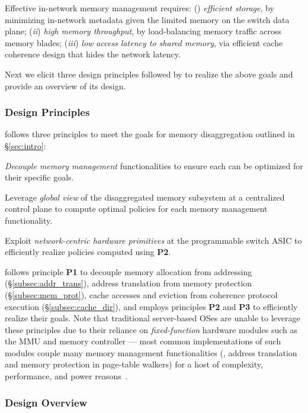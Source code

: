 Effective in-network memory management requires: () \emph{efficient storage}, by  minimizing in-network metadata given the limited memory on the switch data plane;  (\textit{ii}) \emph{high memory throughput}, by load-balancing memory traffic across memory blades; (\textit{iii}) \emph{low access latency to shared memory}, via efficient cache coherence design that hides the network latency.

Next we elicit  three design principles followed by \mind to realize the above goals and provide an overview of its design.

\subsubsection{Design Principles}
\label{sssec:principles}

\mind follows three principles to meet the goals for memory disaggregation outlined in \S\ref{sec:intro}:

 \textit{Decouple memory management} functionalities to ensure each can be optimized for their specific goals.

 Leverage \textit{global view} of the disaggregated memory subsystem at a centralized control plane to compute optimal policies for each memory management functionality.

 Exploit \textit{network-centric hardware primitives} at the programmable switch ASIC to efficiently realize policies computed using \textbf{P2}.

\vspace{0.075in}\noindent

\mind follows principle \textbf{P1} to decouple memory allocation from addressing (\S\ref{subsec:addr_trans}), address translation from memory protection (\S\ref{subsec:mem_prot}),  cache accesses and eviction from coherence protocol execution (\S\ref{subsec:cache_dir}),  and employs principles \textbf{P2} and \textbf{P3} to efficiently realize their goals. Note that traditional server-based OSes are unable to leverage these principles due to  their reliance on \textit{fixed-function} hardware modules such as the MMU and memory controller --- most common implementations of such modules couple many memory management functionalities (\eg, address translation and memory protection in page-table walkers) for a host of complexity, performance, and power reasons~\cite{vmbook, seesaw, rmmlite}.

\subsubsection{Design Overview}
\label{sssec:design}

